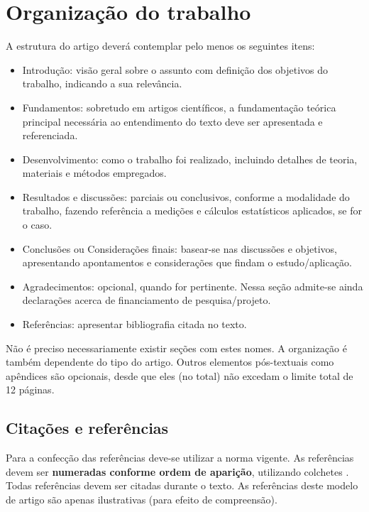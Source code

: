 \documentclass[12pt, a4paper, twoside, onecolumn]{article}
\begin{document}
\section{Organização do trabalho}

A estrutura do artigo deverá contemplar pelo menos os seguintes itens:
%
\begin{itemize}[noitemsep,topsep=0ex] \itemsep=3pt
	\item Introdução: visão geral sobre o assunto com definição dos objetivos do trabalho, indicando a sua relevância.
	\item Fundamentos: sobretudo em artigos científicos, a fundamentação teórica principal necessária ao entendimento do texto deve ser apresentada e referenciada. 
	\item Desenvolvimento: como o trabalho foi realizado, incluindo detalhes de teoria, materiais e métodos empregados.
	\item Resultados e discussões: parciais ou conclusivos, conforme a modalidade do trabalho, fazendo referência a medições e cálculos estatísticos aplicados, se for o caso.
	\item Conclusões ou Considerações finais: basear-se nas discussões e objetivos, apresentando apontamentos e considerações que findam o estudo/aplicação.
	\item Agradecimentos: opcional, quando for pertinente. Nessa seção admite-se ainda declarações acerca de financiamento de pesquisa/projeto.
	\item Referências: apresentar bibliografia citada no texto.
\end{itemize}
%
Não é preciso necessariamente existir seções com estes nomes. A organização é também dependente do tipo do artigo.
Outros elementos pós-textuais como apêndices são opcionais, desde que eles (no total) não excedam o limite total de 12 páginas. 

\subsection{Citações e referências}

Para a confecção das referências deve-se utilizar a norma vigente. As referências devem ser \textbf{numeradas conforme ordem de aparição}, utilizando colchetes \cite{Gomes-2015}. Todas referências devem ser citadas durante o texto. As referências \cite{Mareze-2017,Fonseca-2013,Brandao-2017,Gomes-2015,Oppenheim-2010,Muller-2001,Mareze-2019,aev:piccini2020} deste modelo de artigo são apenas ilustrativas (para efeito de compreensão).
\end{document}
